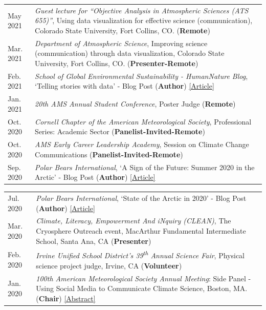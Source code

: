 \documentclass[margin,line,palatino,courier,10pt]{res}
\begin{document}
\begin{resume}
\begin{tabular}{@{}p{0.9in}p{4in}}
May 2021 & \textit{Guest lecture for ``Objective Analysis in Atmospheric Sciences (ATS 655)''}, Using data visualization for effective science (communication), Colorado State University, Fort Collins, CO. (\textbf{Remote})\\
Mar. 2021 & \textit{Department of Atmospheric Science}, Improving science (communication) through data visualization, Colorado State University, Fort Collins, CO. (\textbf{Presenter-Remote})\\
Feb. 2021 & \textit{School of Global Environmental Sustainability - HumanNature Blog}, `Telling stories with data' - Blog Post (\textbf{Author}) \href{https://sustainability.colostate.edu/blog/humannature/zachary-labe/}{[Article]}\\
Jan. 2021 & \textit{20th AMS Annual Student Conference}, Poster Judge (\textbf{Remote})\\
Oct. 2020 & \textit{Cornell Chapter of the American Meteorological Society}, Professional Series: Academic Sector (\textbf{Panelist-Invited-Remote})\\
Oct. 2020 & \textit{AMS Early Career Leadership Academy}, Session on Climate Change Communications (\textbf{Panelist-Invited-Remote})\\
Sep. 2020 & \textit{Polar Bears International}, `A Sign of the Future: Summer 2020 in the Arctic' - Blog Post (\textbf{Author}) \href{https://polarbearsinternational.org/news/article-climate-change/a-sign-of-the-future-summer-2020-in-the-arctic/}{[Article]}\\
\end{tabular}
\begin{tabular}{@{}p{0.9in}p{4in}}
Jul. 2020 & \textit{Polar Bears International}, `State of the Arctic in 2020' - Blog Post (\textbf{Author}) \href{https://polarbearsinternational.org/news/article-climate-change/state-of-the-arctic-in-2020/}{[Article]}\\
Mar. 2020 &\textit{Climate, Literacy, Empowerment And iNquiry (CLEAN)}, The Cryosphere Outreach event, MacArthur Fundamental Intermediate School, Santa Ana, CA (\textbf{Presenter})\\
Feb. 2020 & \textit{Irvine Unified School District's 39\textsuperscript{th} Annual Science Fair}, Physical science project judge, Irvine, CA (\textbf{Volunteer})\\
Jan. 2020 & \textit{100th American Meteorological Society Annual Meeting}: Side Panel - Using Social Media to Communicate Climate Science, Boston, MA. (\textbf{Chair}) \href{https://ams.confex.com/ams/2020Annual/meetingapp.cgi/Session/53195}{[Abstract]}\\

\end{tabular}
\end{resume}
\end{document}
